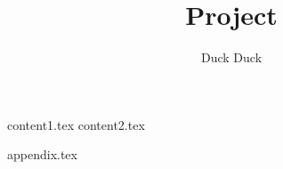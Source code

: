 \documentclass[a4paper; 12pt]{article}
\title{Project}
\author{Duck Duck}
\begin{document}
\maketitle
\date

\tableofcontents


{content1.tex}
{content2.tex}


\begin{appendix}
    {appendix.tex}
\end{appendix}
\newpage

\printbibliography
\end{document}
